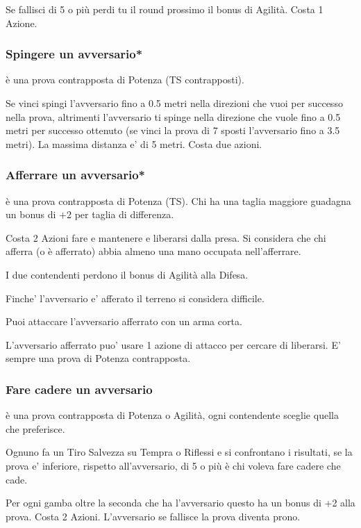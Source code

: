 \documentclass[a4paper,11pt,twoside,openany]{book}
\begin{document}
Se fallisci di 5 o più perdi tu il round prossimo il bonus di Agilità.
Costa 1 Azione.

\subsubsection{Spingere un avversario*} è una prova contrapposta di Potenza (TS contrapposti).

Se vinci spingi l'avversario fino a 0.5 metri nella direzioni che vuoi per successo nella prova, altrimenti l'avversario ti spinge nella direzione che vuole fino a 0.5 metri per successo ottenuto (se vinci la prova di 7 sposti l'avversario fino a 3.5 metri). La massima distanza e' di 5 metri.
Costa due azioni.

\subsubsection{Afferrare un avversario*} è una prova contrapposta di Potenza (TS). Chi ha una taglia maggiore guadagna un bonus di +2 per taglia di differenza.

Costa 2 Azioni fare e mantenere e liberarsi dalla presa. Si considera che chi afferra (o è afferrato) abbia almeno una mano occupata nell'afferrare.

I due contendenti perdono il bonus di Agilità alla Difesa.

Finche' l'avversario e' afferato il terreno si considera difficile.

Puoi attaccare l'avversario afferrato con un arma corta.

L'avversario afferrato puo' usare 1 azione di attacco per cercare di liberarsi. E' sempre una prova di Potenza contrapposta.

\subsubsection{Fare cadere un avversario} è una prova contrapposta di Potenza o Agilità, ogni contendente sceglie quella che preferisce.

Ognuno fa un Tiro Salvezza su Tempra o Riflessi e si confrontano i risultati, se la prova e' inferiore, rispetto all'avversario, di 5 o più è chi voleva fare cadere che cade.

Per ogni gamba oltre la seconda che ha l'avversario questo ha un bonus di +2 alla prova. Costa 2 Azioni. L'avversario se fallisce la prova diventa prono.
\end{document}

